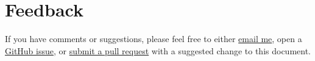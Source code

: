 
\section{Feedback}
\label{sec:feedback}

If you have comments or suggestions, please feel free to either \href{mailto:adam.liter@gmail.com}{email me}, open a \href{https://github.com/adamliter/latex-workshop/issues}{GitHub issue}, or \href{https://help.github.com/articles/creating-a-pull-request/}{submit a pull request} with a suggested change to this document.